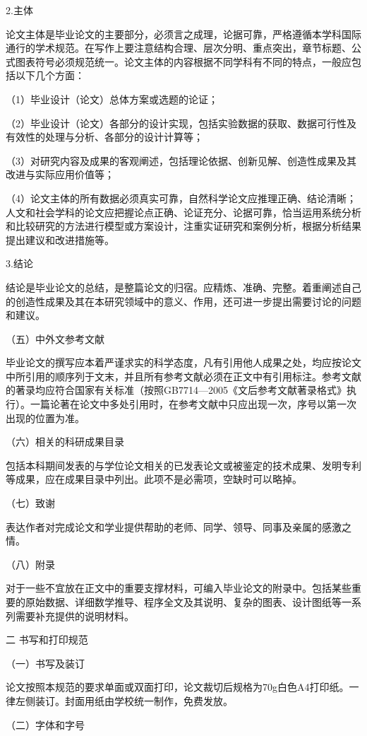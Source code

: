 2.主体

论文主体是毕业论文的主要部分，必须言之成理，论据可靠，严格遵循本学科国际通行的学术规范。在写作上要注意结构合理、层次分明、重点突出，章节标题、公式图表符号必须规范统一。论文主体的内容根据不同学科有不同的特点，一般应包括以下几个方面：

（1）毕业设计（论文）总体方案或选题的论证；

（2）毕业设计（论文）各部分的设计实现，包括实验数据的获取、数据可行性及有效性的处理与分析、各部分的设计计算等；

（3）对研究内容及成果的客观阐述，包括理论依据、创新见解、创造性成果及其改进与实际应用价值等；

（4）论文主体的所有数据必须真实可靠，自然科学论文应推理正确、结论清晰；人文和社会学科的论文应把握论点正确、论证充分、论据可靠，恰当运用系统分析和比较研究的方法进行模型或方案设计，注重实证研究和案例分析，根据分析结果提出建议和改进措施等。

3.结论

结论是毕业论文的总结，是整篇论文的归宿。应精炼、准确、完整。着重阐述自己的创造性成果及其在本研究领域中的意义、作用，还可进一步提出需要讨论的问题和建议。

（五）中外文参考文献

毕业论文的撰写应本着严谨求实的科学态度，凡有引用他人成果之处，均应按论文中所引用的顺序列于文末，并且所有参考文献必须在正文中有引用标注。参考文献的著录均应符合国家有关标准（按照GB7714—2005《文后参考文献著录格式》执行）。一篇论著在论文中多处引用时，在参考文献中只应出现一次，序号以第一次出现的位置为准。

（六）相关的科研成果目录

包括本科期间发表的与学位论文相关的已发表论文或被鉴定的技术成果、发明专利等成果，应在成果目录中列出。此项不是必需项，空缺时可以略掉。

（七）致谢

表达作者对完成论文和学业提供帮助的老师、同学、领导、同事及亲属的感激之情。

（八）附录

对于一些不宜放在正文中的重要支撑材料，可编入毕业论文的附录中。包括某些重要的原始数据、详细数学推导、程序全文及其说明、复杂的图表、设计图纸等一系列需要补充提供的说明材料。

二 \quad 书写和打印规范

（一）书写及装订

论文按照本规范的要求单面或双面打印，论文裁切后规格为70g白色A4打印纸。一律左侧装订。封面用纸由学校统一制作，免费发放。

（二）字体和字号

